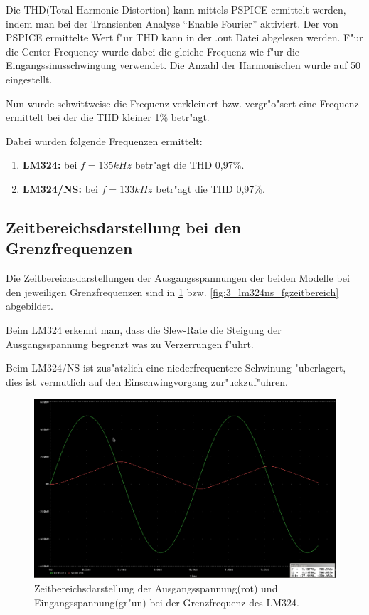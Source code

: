 Die THD(Total Harmonic Distortion) kann mittels PSPICE ermittelt werden, indem man
bei der Transienten Analyse ``Enable Fourier'' aktiviert. Der von PSPICE ermittelte
Wert f"ur THD kann in der .out Datei abgelesen werden.
F"ur die Center Frequency wurde dabei die gleiche Frequenz wie f"ur die Eingangssinusschwingung verwendet.
Die Anzahl der Harmonischen wurde auf 50 eingestellt.

Nun wurde schwittweise die Frequenz verkleinert bzw. vergr"o"sert eine Frequenz ermittelt bei der
die THD kleiner 1\% betr"agt.

Dabei wurden folgende Frequenzen ermittelt:

\begin{enumerate}
 \item \textbf{LM324:} bei $f = 135 kHz$ betr"agt die THD 0,97\%.
 \item \textbf{LM324/NS:} bei $f = 133 kHz$ betr"agt die THD 0,97\%.
\end{enumerate}

\subsection{Zeitbereichsdarstellung bei den Grenzfrequenzen}
Die Zeitbereichsdarstellungen der Ausgangsspannungen der beiden Modelle bei den jeweiligen Grenzfrequenzen
sind in \ref{fig:3_lm324_fgzeitbereich} bzw. \ref{fig:3_lm324ns_fgzeitbereich} abgebildet.

Beim LM324 erkennt man, dass die Slew-Rate die Steigung der Ausgangsspannung begrenzt was zu
Verzerrungen f"uhrt.

Beim LM324/NS ist zus"atzlich eine niederfrequentere Schwinung "uberlagert, dies ist vermutlich
auf den Einschwingvorgang zur"uckzuf"uhren.

\begin{figure}[h!]
 \centering
 \includegraphics[width=16cm,keepaspectratio=true]{./fig/3_lm324_fgzeitbereich.png}
 \caption{Zeitbereichsdarstellung der Ausgangsspannung(rot) und Eingangsspannung(gr"un) bei der Grenzfrequenz des LM324.}
 \label{fig:3_lm324_fgzeitbereich}
\end{figure}


